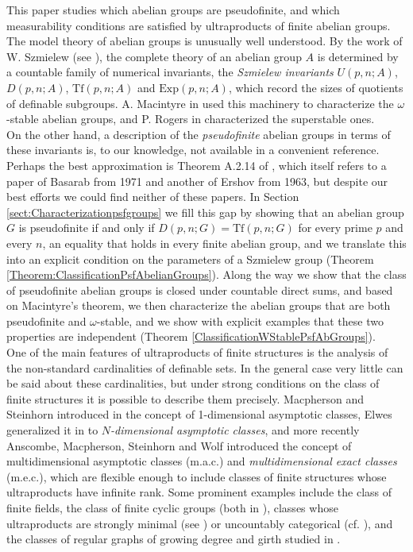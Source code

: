 \documentclass[11pt]{amsart}
\theoremstyle{definition}
\begin{document}
This paper studies which abelian groups are pseudofinite, and which measurability conditions
are satisfied by ultraproducts of finite abelian groups. The model theory of abelian groups is unusually well understood. By the
work of W. Szmielew (see \cite[Appendix A.2]{Hodges-ModelTheory}), the complete theory of an abelian group $A$ is determined by a countable
family of numerical invariants, the \emph{Szmielew invariants}
$U(p,n;A)$, $D(p,n;A)$, $\mathrm{Tf}(p,n;A)$ and $\mathrm{Exp}(p,n;A)$, which
record the sizes of quotients of definable subgroups. A. Macintyre in \cite{Macintyre1971} used this machinery to characterize the $\omega$-stable
abelian groups, and P. Rogers in \cite{PhD-PatriciaRogers} characterized the superstable
ones.\\

On the other hand, a description of the \emph{pseudofinite} abelian
groups in terms of these invariants is, to our knowledge, not available in
a convenient reference. Perhaps the best approximation is Theorem A.2.14 of \cite{Hodges-ModelTheory}, which itself refers to a paper of Basarab from 1971 and another of Ershov from 1963, but despite our best efforts we could find neither of these papers. In
Section \ref{sect:Characterizationpsfgroups} we fill this gap by showing that an abelian group $G$ is
pseudofinite if and only if $D(p,n;G)=\mathrm{Tf}(p,n;G)$ for every prime $p$ and every $n$, an equality that holds in every finite abelian group, and we
translate this into an explicit condition on the parameters of a Szmielew
group (Theorem \ref{Theorem:ClassificationPsfAbelianGroups}). Along the way we show that the
class of pseudofinite abelian groups is closed under countable direct sums, and based on  Macintyre's theorem, we
then characterize the abelian groups that are both pseudofinite and
$\omega$-stable, and we show with explicit examples that these two properties
are independent (Theorem \ref{ClassificationWStablePsfAbGroups}).\\

One of the main features of ultraproducts of finite structures is the
analysis of the non-standard cardinalities of definable sets. In the
general case very little can be said about these cardinalities, but under strong
conditions on the class of finite structures it is possible to describe
them precisely. Macpherson and Steinhorn introduced in \cite{Macpherson-Steinhorn}  the concept of 1-dimensional asymptotic classes, Elwes generalized it in \cite{Elwes-AsymptoticClasses} to
\emph{$N$-dimensional asymptotic classes}, and more recently Anscombe, Macpherson, Steinhorn and
Wolf \cite{AMSW} introduced the concept of multidimensional asymptotic classes (m.a.c.) and \emph{multidimensional exact
classes} (m.e.c.), which are flexible enough to include classes of finite structures whose
ultraproducts have infinite rank. Some prominent examples include the class of
finite fields, the class of finite cyclic groups (both in \cite{Macpherson-Steinhorn}), classes whose ultraproducts are strongly minimal (see \cite{Pillay-stronglyminimalpsf}) or uncountably
categorical (cf. \cite{vanAbel-counting}), and the classes of regular graphs of growing
degree and girth studied in \cite{Garcia-Robles}.\\
\end{document}

